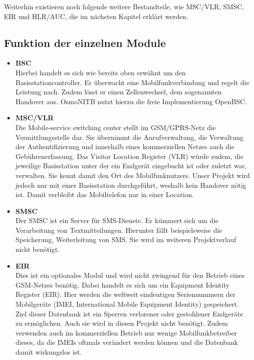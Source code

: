 Weiterhin existieren noch folgende weitere Bestandteile, wie MSC/VLR, SMSC, EIR und HLR/AUC, die im nächsten Kapitel erklärt werden.



\subsection{Funktion der einzelnen Module}




\begin{itemize}

\item \textbf{BSC}\\
Hierbei handelt es sich wie bereits oben erwähnt um den Basisstationcontroller. Er überwacht eine Mobilfunkverbindung und regelt die Leistung nach. Zudem lösst er einen Zellenwechsel, dem sogenannten Handover aus. OsmoNITB nutzt hierzu die freie Implementierung OpenBSC.  

 
\item \textbf{MSC/VLR}\\
Die Mobile-service switching center stellt im GSM/GPRS-Netz die Vermittlungsstelle dar. Sie übernimmt die Anrufverwaltung, die Verwaltung der Authentifizierung und innerhalb eines kommerziellen Netzes auch die Gebührenerfassung. Das Visitor Location Register (VLR) würde zudem, die jeweilige Basisstation unter der ein Endgerät eingebucht ist oder zuletzt war, verwalten. Sie kennt damit den Ort des Mobilfunknutzers. Unser Projekt wird jedoch nur mit einer Basisstation durchgeführt, weshalb kein Handover nötig ist. Damit verbleibt das Mobiltelefon nur in einer Location. 


\item \textbf{SMSC}\\
Der SMSC ist ein Server für SMS-Dienste. Er kümmert sich um die Verarbeitung von Textmitteilungen. Hierunter fällt beispielsweise die Speicherung, Weiterleitung von SMS. Sie wird im weiteren Projektverlauf nicht benötigt.


\item \textbf{EIR}\\
Dies ist ein optionales Modul und wird nicht zwingend für den Betrieb eines GSM-Netzes benötig. Dabei handelt es sich um ein Equipment Identity Register (EIR). Hier werden die weltweit eindeutigen Seriennummern der Mobilgeräte (IMEI, International Mobile Equipment Identity) gespeichert. Ziel dieser Datenbank ist ein Sperren verlorener oder gestohlener Endgeräte zu ermöglichen. Auch sie wird in diesen Projekt nicht benötigt. Zudem verwenden auch im kommerziellen Betrieb nur wenige Mobilfunkbetreiber dieses, da die IMEIs oftmals verändert werden können und die Datenbank damit wirkungslos ist.  



\end{itemize}
